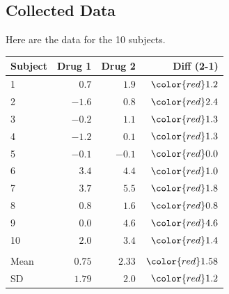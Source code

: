 \subsection{Collected Data}
Here are the data for the 10 subjects.
\begin{table}[!hbp]
 \begin{center}
 \begin{tabular}{lrrr}\hline\hline
Subject & Drug 1 & Drug 2 & {\color{red}Diff (2-1)}
\\ \hline
1 & $ 0.7$&$ 1.9$&$\color{red}1.2$\\
2 &$-1.6$&$ 0.8$&$\color{red}2.4$\\
3 &$-0.2$&$ 1.1$&$\color{red}1.3$\\
4 &$-1.2$&$ 0.1$&$\color{red}1.3$\\
5 &$-0.1$&$-0.1$&$\color{red}0.0$\\
6 &$ 3.4$&$ 4.4$&$\color{red}1.0$\\
7 &$ 3.7$&$ 5.5$&$\color{red}1.8$\\
8 &$ 0.8$&$ 1.6$&$\color{red}0.8$\\
9 &$ 0.0$&$ 4.6$&$\color{red}4.6$\\
10 &$ 2.0$&$ 3.4$&$\color{red}1.4$\\ \\
Mean & $ 0.75$&$ 2.33$&$\color{red}1.58$\\
SD & $ 1.79$&$ 2.0$&$\color{red}1.2$\\
\hline
\end{tabular}\label{sleeppaired}
\end{center}
\end{table}
